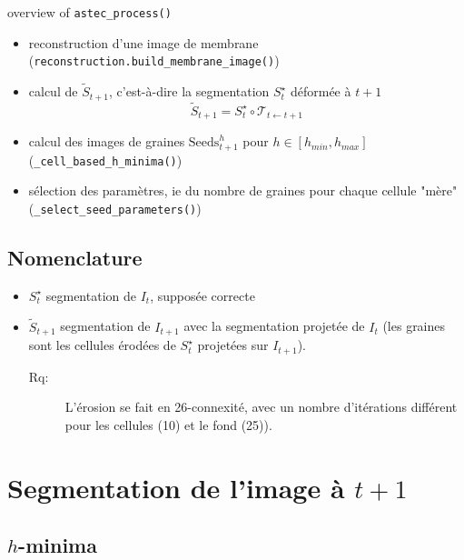 \documentclass{article}
\newenvironment{remarque}{\color{red}\begin{description}\item[Rq:]}
{\end{description}\color{black}}
\begin{document}
overview of \verb|astec_process()|

\begin{itemize}

\item reconstruction d'une image de membrane 
(\verb|reconstruction.build_membrane_image()|)

\item calcul de $\tilde{S}_{t+1}$, c'est-\`a-dire la segmentation $S^{\star}_{t}$ d\'eform\'ee \`a $t+1$ 
\begin{displaymath}
\tilde{S}_{t+1} = S^{\star}_{t} \circ \mathcal{T}_{t \leftarrow t+1}
\end{displaymath}

\item calcul des images de graines $\mathrm{Seeds}^{h}_{t+1}$ pour $h \in [h_{min}, h_{max}]$ (\verb|_cell_based_h_minima()|)

\item s\'election des param\`etres, ie du nombre de graines pour chaque cellule "m\`ere" (\verb|_select_seed_parameters()|)

\end{itemize}


\subsection*{Nomenclature}

\begin{itemize}
\item $S^{\star}_t$ segmentation de $I_{t}$, suppos\'ee correcte
\item $\tilde{S}_{t+1}$ segmentation de $I_{t+1}$ avec la segmentation projet\'ee de $I_{t}$ (les graines sont les cellules \'erod\'ees de $S^{\star}_t$ projet\'ees sur $I_{t+1}$).
\begin{remarque}
L'\'erosion se fait en 26-connexit\'e, avec un nombre d'it\'erations diff\'erent pour les cellules (10) et le fond (25)). 
\end{remarque}
\end{itemize}


\section{Segmentation de l'image \`a $t+1$}

\subsection{$h$-minima}
\end{document}

